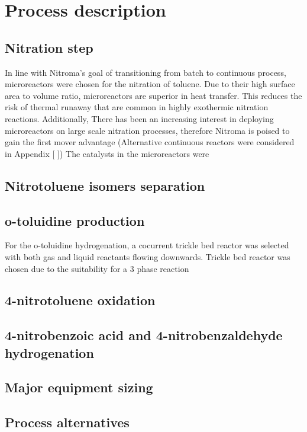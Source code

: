 \section{Process description}
\label{sec:process}
\subsection{Nitration step}
In line with Nitroma's goal of transitioning from batch to continuous process, microreactors were chosen for the nitration of toluene. Due to their high surface area to volume ratio, microreactors are superior in heat transfer. This reduces the risk of thermal runaway that are common in highly exothermic nitration reactions. Additionally,   
There has been an increasing interest in deploying microreactors on large scale nitration processes, therefore Nitroma is poised to gain the first mover advantage 
(Alternative continuous reactors were considered in Appendix [ ])
The catalysts in the microreactors were 
\subsection{Nitrotoluene isomers separation}



\subsection{o-toluidine production}
For the o-toluidine hydrogenation, a cocurrent trickle bed reactor was selected
with both gas and liquid reactants flowing downwards. Trickle bed reactor was chosen 
due to the suitability for a 3 phase reaction 

\subsection{4-nitrotoluene oxidation}

\subsection{4-nitrobenzoic acid and 4-nitrobenzaldehyde hydrogenation}


\subsection{Major equipment sizing}


\subsection{Process alternatives}



